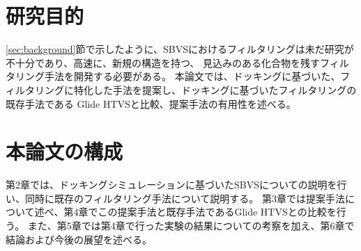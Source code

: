 \section{研究目的}
\ref{sec:background}節で示したように、SBVSにおけるフィルタリングは未だ研究が不十分であり、高速に、新規の構造を持つ、
見込みのある化合物を残すフィルタリング手法を開発する必要がある。
本論文では、ドッキングに基づいた、フィルタリングに特化した手法を提案し、ドッキングに基づいたフィルタリングの既存手法である
Glide HTVSと比較、提案手法の有用性を述べる。

\section{本論文の構成}
第2章では、ドッキングシミュレーションに基づいたSBVSについての説明を行い、同時に既存のフィルタリング手法について説明する。
第3章では提案手法について述べ、第4章でこの提案手法と既存手法であるGlide HTVSとの比較を行う。
また、第5章では第4章で行った実験の結果についての考察を加え、第6章で結論および今後の展望を述べる。